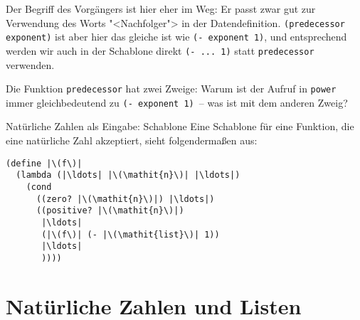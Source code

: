 Der Begriff des Vorgängers ist hier eher im Weg: Er passt zwar gut zur
Verwendung des Worts "<Nachfolger"> in der
Datendefinition. \lstinline{(predecessor exponent)} ist aber hier das
gleiche ist wie \lstinline{(- exponent 1)}, und entsprechend werden
wir auch in der Schablone direkt \lstinline{(- ... 1)} statt
\lstinline{predecessor} verwenden.
\begin{aufgabe}
  Die Funktion \lstinline{predecessor} hat zwei Zweige: Warum ist der
  Aufruf in \lstinline{power} immer gleichbedeutend zu
  \lstinline{(- exponent 1)}~-- was ist mit dem anderen Zweig?
\end{aufgabe}


\begin{konstruktionsanleitung}{Natürliche Zahlen als Eingabe: Schablone}
  \label{ka:nats-eingabe-schablone}
  Eine Schablone für eine Funktion, die eine natürliche Zahl akzeptiert, sieht
folgendermaßen aus:
%
\begin{lstlisting}
(define |\(f\)|
  (lambda (|\ldots| |\(\mathit{n}\)| |\ldots|)
    (cond
      ((zero? |\(\mathit{n}\)|) |\ldots|)
      ((positive? |\(\mathit{n}\)|)
       |\ldots|
       (|\(f\)| (- |\(\mathit{list}\)| 1))
       |\ldots|
       ))))
\end{lstlisting}
  
\end{konstruktionsanleitung}

\section{Natürliche Zahlen und Listen}

